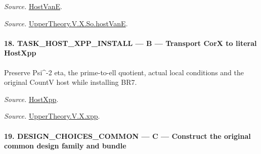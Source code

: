 \emph{Source.} \href{https://github.com/CocoSgt/riemann-hypothesis-lean/blob/7cbf7a0c32fca1badf05931879a37c3f8a2b03b4/src/Development/AutomorphicArithmetic/AutomorphicVarieties/UnitaryThreeDeformations/HostNumber.lean#L9-L12}{HostVanE}.

\emph{Source.} \href{https://github.com/CocoSgt/riemann-hypothesis-lean/blob/7cbf7a0c32fca1badf05931879a37c3f8a2b03b4/src/Development/AutomorphicArithmetic/AutomorphicVarieties/LevelCohomology/SoHostVanE.lean#L11-L18}{UpperTheory.V.X.So.hostVanE}.



\paragraph{18. TASK\_\allowbreak HOST\_\allowbreak XPP\_\allowbreak INSTALL — B — Transport CorX to literal HostXpp}

Preserve Psi\textasciicircum{}-2 eta, the prime-to-ell quotient, actual local conditions and the original CountV host while installing BR7.

\emph{Source.} \href{https://github.com/CocoSgt/riemann-hypothesis-lean/blob/7cbf7a0c32fca1badf05931879a37c3f8a2b03b4/src/Development/AutomorphicArithmetic/AutomorphicVarieties/UnitaryThreeDeformations/HostNumber.lean#L14-L17}{HostXpp}.

\emph{Source.} \href{https://github.com/CocoSgt/riemann-hypothesis-lean/blob/7cbf7a0c32fca1badf05931879a37c3f8a2b03b4/src/Development/AutomorphicArithmetic/AutomorphicVarieties/LevelCohomology/Xpp.lean#L11-L84}{UpperTheory.V.X.xpp}.



\paragraph{19. DESIGN\_\allowbreak CHOICES\_\allowbreak COMMON — C — Construct the original common design family and bundle}

